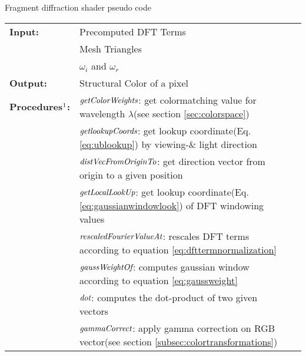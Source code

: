 \begin{algorithm}[H]
  \caption{Fragment diffraction shader pseudo code}
  \begin{table}[H]
    \begin{tabular}{@{}lll@{}}
      \textbf{Input:} & Precomputed DFT Terms  \\
      & Mesh Triangles  \\
      & $\omega_i$ and $\omega_r$  \\
      \textbf{Output:} & Structural Color of a pixel \\
      \textbf{Procedures$\footnotemark$:} & $\emph{getColorWeights}$: get colormatching value for wavelength $\lambda$(see section \ref{sec:colorspace})\\
      & $\emph{getlookupCoords}$: get lookup coordinate(Eq.\ref{eq:ublookup}) by viewing-\& light direction \\
      & $\emph{distVecFromOriginTo}$: get direction vector from origin to a given position \\
      & $\emph{getLocalLookUp}$: get lookup coordinate(Eq.\ref{eq:gaussianwindowlook}) of DFT windowing values \\
      & $\emph{rescaledFourierValueAt}$: rescales DFT terms according to equation \ref{eq:dfttermnormalization}\\
      & $\emph{gaussWeightOf}$: computes gaussian window according to equation \ref{eq:gaussweight} \\
      & $\emph{dot}$: computes the dot-product of two given vectors \\
      & $\emph{gammaCorrect}$: apply gamma correction on RGB vector(see section \ref{subsec:colortransformations}) \\  
    \end{tabular} 
  \end{table}
  

\end{algorithm}
